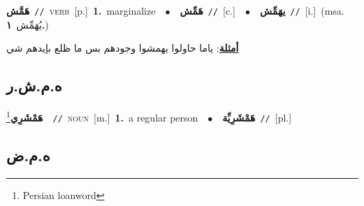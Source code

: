 \documentclass[10pt,a4paper,twoside]{article} %
\begin{document}
\begin{multicols}{2}
{\setlength\topsep{0pt}\textbf{\foreignlanguage{arabic}{هَمَّش}}\ {\color{gray}\texttt{//}\color{black}}\ \textsc{verb}\ [p.]\ \textbf{1.}~marginalize\ \ $\bullet$\ \ \setlength\topsep{0pt}\textbf{\foreignlanguage{arabic}{هَمِّش}}\ {\color{gray}\texttt{//}\color{black}}\ [c.]\ \ $\bullet$\ \ \setlength\topsep{0pt}\textbf{\foreignlanguage{arabic}{يهَمِّش}}\ {\color{gray}\texttt{//}\color{black}}\ [i.]\ \color{gray}(msa. \foreignlanguage{arabic}{يُهَمِّش}~\foreignlanguage{arabic}{\textbf{١.}})\color{black}\  \begin{flushright}\color{gray}\foreignlanguage{arabic}{\textbf{\underline{\foreignlanguage{arabic}{أمثلة}}}: ياما حاولوا يهمشوا وجودهم بس ما ظلع بإيدهم شي}\end{flushright}\color{black}} \vspace{2mm}

\vspace{-3mm}
\subsection*{\color{blue}\foreignlanguage{arabic}{ه.م.ش.ر}\color{blue}{}} 

{\setlength\topsep{0pt}\textbf{\foreignlanguage{arabic}{هَمْشَرِي}}\footnote{Persian loanword}\ \ {\color{gray}\texttt{//}\color{black}}\ \textsc{noun}\ [m.]\ \textbf{1.}~a regular person\ \ $\bullet$\ \ \setlength\topsep{0pt}\textbf{\foreignlanguage{arabic}{هَمْشَرِيِّة}}\ {\color{gray}\texttt{//}\color{black}}\ [pl.]\ } \vspace{2mm}

\vspace{-3mm}
\subsection*{\color{blue}\foreignlanguage{arabic}{ه.م.ض}\color{blue}{}} 


\end{multicols}
\end{document}
